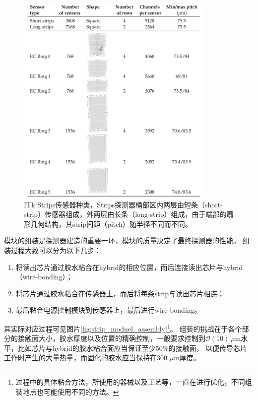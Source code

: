 \begin{figure}[h]
\centering
 \includegraphics[width=0.85\textwidth]{fig/strips_sensor_overview.png}
 \caption{ITk Strips传感器种类\cite{Collaboration:2017mtb}，Strips探测器桶部区内两层由短条（short-strip）传感器组成，外两层由长条（long-strip）组成，由于端部的扇形几何结构，其strip间距（pitch）随半径不同而不同。}
 \label{fig:strip_sensor_overview}
\end{figure}
模块的组装是探测器建造的重要一环，模块的质量决定了最终探测器的性能。
组装过程大致可以分为以下几步：
\begin{enumerate}
 \item 将读出芯片通过胶水粘合在hybrid的相应位置，而后连接读出芯片与hybrid（wire-bonding）；
 \item 将芯片通过胶水粘合在传感器上，而后将每条strip与读出芯片相连；
 \item 最后粘合电源控制模块到传感器上，最后进行wire-bonding。
\end{enumerate}
其实际对应过程可见图片\ref{fig:strip_moduel_assembly}\footnote{过程中的具体粘合方法，所使用的器械以及工艺等，一直在进行优化，不同组装地点也可能使用不同的方法。}。
组装的挑战在于各个部分的接触面大小，胶水厚度以及位置的精确控制，一般要求控制到$\mathcal{O(10)}~\mu\text{m}$水平，比如芯片与hybrid的胶水粘合面应当保证至少50\%的接触面，
以便传导芯片工作时产生的大量热量，而固化的胶水应当保持在300 $\mu\text{m}$厚度。
